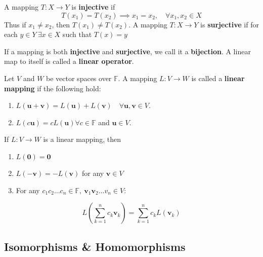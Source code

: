 \documentclass{article}
\begin{document}
\begin{definition}
    A mapping $T: X \rightarrow Y$ is \textbf{injective} if 
    \begin{equation*}
        T(x_{1}) = T(x_{2}) \implies x_{1} = x_{2}, \quad \forall x_{1}, x_{2} \in X
    \end{equation*}
    Thus if $x_{1} \neq x_{2}$, then $T(x_{1}) \neq T(x_{2})$. A mapping $T: X\rightarrow Y$ is \textbf{surjective} if for each $y\in Y \ \exists x \in X$ such that $T(x) = y$  
\end{definition}

If a mapping is both \textbf{injective} and \textbf{surjective}, we call it a \textbf{bijection}. A linear map to itself is called a \textbf{linear operator}. 

\begin{definition}
    Let $V$ and $W$ be vector spaces over $\mathbb{F}$. A mapping $L:V\rightarrow W$ is called a \textbf{linear mapping} if the following hold:
    \begin{enumerate}
        \item $L(\bm{u} + \bm{v}) = L(\bm{u}) + L(\bm{v}) \quad \forall \bm{u}, \bm{v} \in V$.  
        \item $L(c\bm{u}) = cL(\bm{u}) \forall c\in \mathbb{F}$ and $\bm{u} \in V$.  
    \end{enumerate}
\end{definition}

\begin{proposition}
    If $L: V \rightarrow W$ is a linear mapping, then 
    \begin{enumerate}
        \item $L(\bm{0}) = \bm{0}$
        \item $L(-\bm{v}) = -L(\bm{v})$ for any $\bm{v} \in V$
        \item For any $c_{1}c_{2} \dots c_n \in \mathbb{F}, \ \bm{v}_{1} \bm{v}_2 \dots v_n \in V$: 
    \end{enumerate}
    \begin{equation*}
        L\left(\displaystyle\sum_{k=1}^{n}c_k \bm{v}_k\right) = \displaystyle\sum_{k=1}^{n} c_{k}L(\bm{v}_k)
    \end{equation*}
\end{proposition}

\subsection{Isomorphisms \& Homomorphisms}
\end{document}
